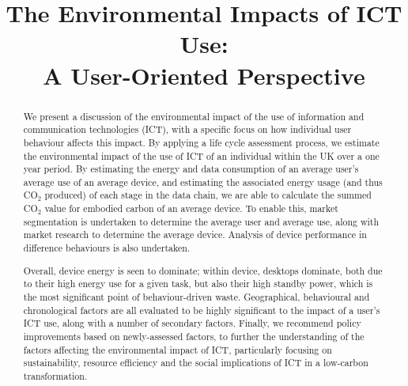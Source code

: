 \documentclass[conference]{IEEEtran}
\begin{document}

\title{The Environmental Impacts of ICT Use:\\A User-Oriented Perspective}


\author{
}





\maketitle


\begin{abstract}
We present a discussion of the environmental impact of the use of
information and communication technologies (ICT), with a specific
focus on how individual user behaviour affects this impact. By
applying a life cycle assessment process, we estimate the
environmental impact of the use of ICT of an individual within the UK
over a one year period. By estimating the energy and data consumption
of an average user's average use of an average device, and estimating
the associated energy usage (and thus CO$_2$ produced) of each stage
in the data chain, we are able to calculate the summed CO$_2$ value
for embodied carbon of an average device. To enable this, market
segmentation is undertaken to determine the average user and average
use, along with market research to determine the average
device. Analysis of device performance in difference behaviours is
also undertaken.

Overall, device energy is seen to dominate; within device, desktops
dominate, both due to their high energy use for a given task, but also
their high standby power, which is the most significant point of
behaviour-driven waste. Geographical, behavioural and chronological
factors are all evaluated to be highly significant to the impact of a
user's ICT use, along with a number of secondary factors. Finally, we
recommend policy improvements based on newly-assessed factors, to
further the understanding of the factors affecting the environmental
impact of ICT, particularly focusing on sustainability, resource
efficiency and the social implications of ICT in a low-carbon
transformation.
\end{abstract}
\end{document}
